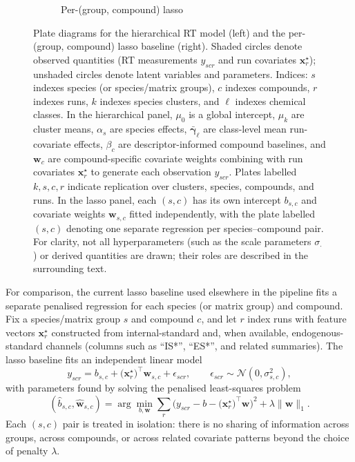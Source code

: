 \documentclass[11pt]{article}
\begin{document}
\begin{figure}[H]
\begin{subfigure}[t]{0.45\textwidth}
\caption{Per-(group, compound) lasso}
\label{fig:rt_lasso_plate}
\end{subfigure}
\caption{Plate diagrams for the hierarchical RT model (left) and the per-(group, compound) lasso baseline (right). Shaded circles denote observed quantities (RT measurements $y_{scr}$ and run covariates $\bm{x}^{\star}_{r}$); unshaded circles denote latent variables and parameters. Indices: $s$ indexes species (or species/matrix groups), $c$ indexes compounds, $r$ indexes runs, $k$ indexes species clusters, and $\ell$ indexes chemical classes. In the hierarchical panel, $\mu_0$ is a global intercept, $\mu_k$ are cluster means, $\alpha_s$ are species effects, $\bar{\bm{\gamma}}_{\ell}$ are class-level mean run-covariate effects, $\beta_c$ are descriptor-informed compound baselines, and $\bm{w}_c$ are compound-specific covariate weights combining with run covariates $\bm{x}^{\star}_{r}$ to generate each observation $y_{scr}$. Plates labelled $k,s,c,r$ indicate replication over clusters, species, compounds, and runs. In the lasso panel, each $(s,c)$ has its own intercept $b_{s,c}$ and covariate weights $\bm{w}_{s,c}$ fitted independently, with the plate labelled $(s,c)$ denoting one separate regression per species--compound pair. For clarity, not all hyperparameters (such as the scale parameters $\sigma_\cdot$) or derived quantities are drawn; their roles are described in the surrounding text.}
\end{figure}

For comparison, the current lasso baseline used elsewhere in the pipeline fits a
separate penalised regression for each species (or matrix group) and compound. Fix a
species/matrix group $s$ and compound $c$, and let $r$ index runs with feature vectors
$\bm{x}^{\star}_{r}$ constructed from internal-standard and, when available,
endogenous-standard channels (columns such as ``IS*'', ``ES*'', and related
summaries). The lasso baseline fits an independent linear model
\begin{equation}
  y_{scr}
  =
  b_{s,c}
  +
  \bigl(\bm{x}^{\star}_{r}\bigr)^{\top}\bm{w}_{s,c}
  +
  \epsilon_{scr},
  \qquad
  \epsilon_{scr}\sim\mathcal{N}(0,\sigma_{s,c}^2),
\end{equation}
with parameters found by solving the penalised least-squares problem
\begin{equation}
  (\hat{b}_{s,c},\hat{\bm{w}}_{s,c})
  =
  \arg\min_{b,\bm{w}}
  \sum_{r}
    \bigl(y_{scr}-b-\bigl(\bm{x}^{\star}_{r}\bigr)^{\top}\bm{w}\bigr)^2
  +\lambda\lVert\bm{w}\rVert_1.
\end{equation}
Each $(s,c)$ pair is treated in isolation: there is no sharing of information across
groups, across compounds, or across related covariate patterns beyond the choice of
penalty $\lambda$.
\end{document}
